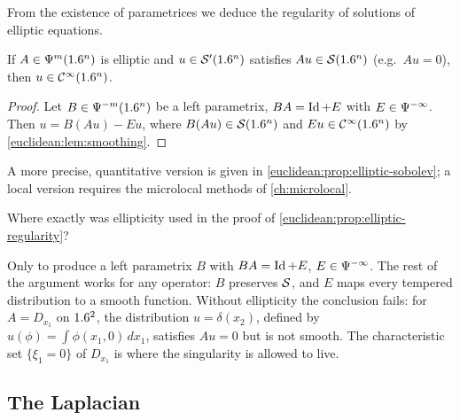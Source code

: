 From the existence of parametrices we deduce the regularity of
solutions of elliptic equations.

\begin{proposition}\label{euclidean:prop:elliptic-regularity}
  If $A\in\Psi^{m}(1.6^n)$ is elliptic and $u\in\mathcal{S}'(1.6^n)$ satisfies
  $Au\in\mathcal{S}(1.6^n)$ \textup{(}e.g.\ $Au=0$\textup{)}, then $u\in\mathcal{C}^\infty(1.6^n)$.
\end{proposition}
\begin{proof}
  Let $B\in\Psi^{-m}(1.6^n)$ be a left parametrix, $BA=\operatorname{Id}+E$ with
  $E\in\Psi^{-\infty}$. Then $u=B(Au)-Eu$, where $B(Au)\in\mathcal{S}(1.6^n)$ and
  $Eu\in\mathcal{C}^\infty(1.6^n)$ by \cref{euclidean:lem:smoothing}.
\end{proof}

A more precise, quantitative version is given in
\cref{euclidean:prop:elliptic-sobolev}; a local version requires the
microlocal methods of \cref{ch:microlocal}.

\begin{question}
Where exactly was ellipticity used in the proof of
\cref{euclidean:prop:elliptic-regularity}?
\end{question}
\begin{answer}
Only to produce a left parametrix $B$ with $BA=\operatorname{Id}+E$, $E\in\Psi^{-\infty}$. The rest of
the argument works for any operator: $B$ preserves $\mathcal{S}$, and $E$ maps every tempered
distribution to a smooth function. Without ellipticity the conclusion fails: for
$A=D_{x_1}$ on $1.6^2$, the distribution $u=\delta(x_2)$, defined by
$u(\phi)=\int\phi(x_1,0)\,dx_1$, satisfies $Au=0$ but is not smooth. The characteristic set $\{\xi_1=0\}$ of $D_{x_1}$ is where the singularity is
allowed to live.
\end{answer}

\subsection{The Laplacian}

